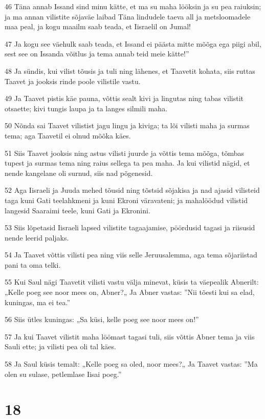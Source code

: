 \par 46 Täna annab Issand sind minu kätte, et ma su maha lööksin ja su pea raiuksin; ja ma annan vilistite sõjaväe laibad Täna lindudele taeva all ja metsloomadele maa peal, ja kogu maailm saab teada, et Iisraelil on Jumal!
\par 47 Ja kogu see väehulk saab teada, et Issand ei päästa mitte mõõga ega piigi abil, sest see on Issanda võitlus ja tema annab teid meie kätte!”
\par 48 Ja sündis, kui vilist tõusis ja tuli ning lähenes, et Taavetit kohata, siis ruttas Taavet ja jooksis rinde poole vilistile vastu.
\par 49 Ja Taavet pistis käe pauna, võttis sealt kivi ja lingutas ning tabas vilistit otsaette; kivi tungis laupa ja ta langes silmili maha.
\par 50 Nõnda sai Taavet vilistist jagu lingu ja kiviga; ta lõi vilisti maha ja surmas tema; aga Taavetil ei olnud mõõka käes.
\par 51 Siis Taavet jooksis ning astus vilisti juurde ja võttis tema mõõga, tõmbas tupest ja surmas tema ning raius sellega ta pea maha. Ja kui vilistid nägid, et nende kangelane oli surnud, siis nad põgenesid.
\par 52 Aga Iisraeli ja Juuda mehed tõusid ning tõstsid sõjakisa ja nad ajasid vilisteid taga kuni Gati teelahkmeni ja kuni Ekroni väravateni; ja mahalöödud vilistid langesid Saaraimi teele, kuni Gati ja Ekronini.
\par 53 Siis lõpetasid Iisraeli lapsed vilistite tagaajamise, pöördusid tagasi ja riisusid nende leerid paljaks.
\par 54 Ja Taavet võttis vilisti pea ning viis selle Jeruusalemma, aga tema sõjariistad pani ta oma telki.
\par 55 Kui Saul nägi Taavetit vilisti vastu välja minevat, küsis ta väepealik Abnerilt: „Kelle poeg see noor mees on, Abner?„ Ja Abner vastas: ”Nii tõesti kui sa elad, kuningas, ma ei tea.”
\par 56 Siis ütles kuningas: „Sa küsi, kelle poeg see noor mees on!”
\par 57 Ja kui Taavet vilistit maha löömast tagasi tuli, siis võttis Abner tema ja viis Sauli ette; ja vilisti pea oli tal käes.
\par 58 Ja Saul küsis temalt: „Kelle poeg sa oled, noor mees?„ Ja Taavet vastas: ”Ma olen su sulase, petlemlase Iisai poeg.”

\chapter{18}

